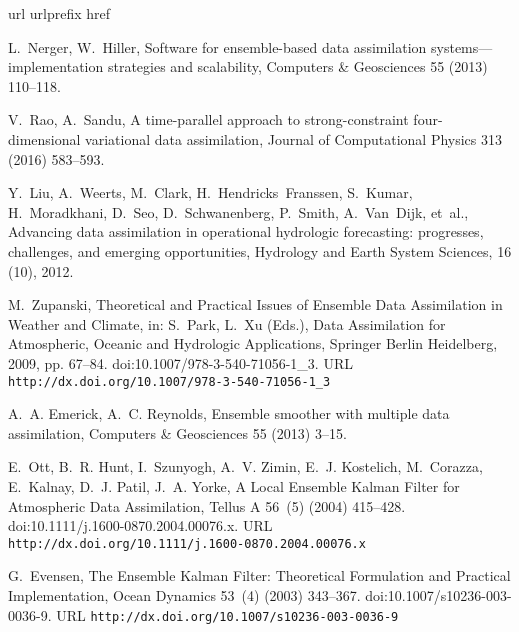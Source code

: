 \documentclass[12pt]{article}
\begin{document}
\begin{thebibliography}{10}
\expandafter\ifx\csname url\endcsname\relax
  \def\url#1{\texttt{#1}}\fi
\expandafter\ifx\csname urlprefix\endcsname\relax\def\urlprefix{URL }\fi
\expandafter\ifx\csname href\endcsname\relax
  \def\href#1#2{#2} \def\path#1{#1}\fi

L.~Nerger, W.~Hiller, Software for ensemble-based data assimilation
  systems—implementation strategies and scalability, Computers \& Geosciences
  55 (2013) 110--118.

V.~Rao, A.~Sandu, A time-parallel approach to strong-constraint
  four-dimensional variational data assimilation, Journal of Computational
  Physics 313 (2016) 583--593.

Y.~Liu, A.~Weerts, M.~Clark, H.~Hendricks~Franssen, S.~Kumar, H.~Moradkhani,
  D.~Seo, D.~Schwanenberg, P.~Smith, A.~Van~Dijk, et~al., Advancing data
  assimilation in operational hydrologic forecasting: progresses, challenges,
  and emerging opportunities, Hydrology and Earth System Sciences, 16 (10),
  2012.

M.~Zupanski, \href{http://dx.doi.org/10.1007/978-3-540-71056-1_3}{{Theoretical
  and Practical Issues of Ensemble Data Assimilation in Weather and Climate}},
  in: S.~Park, L.~Xu (Eds.), Data Assimilation for Atmospheric, Oceanic and
  Hydrologic Applications, Springer Berlin Heidelberg, 2009, pp. 67--84.
\newblock \href {http://dx.doi.org/10.1007/978-3-540-71056-1_3}
  {\path{doi:10.1007/978-3-540-71056-1_3}}.
\newline\urlprefix\url{http://dx.doi.org/10.1007/978-3-540-71056-1_3}

A.~A. Emerick, A.~C. Reynolds, Ensemble smoother with multiple data
  assimilation, Computers \& Geosciences 55 (2013) 3--15.

E.~Ott, B.~R. Hunt, I.~Szunyogh, A.~V. Zimin, E.~J. Kostelich, M.~Corazza,
  E.~Kalnay, D.~J. Patil, J.~A. Yorke,
  \href{http://dx.doi.org/10.1111/j.1600-0870.2004.00076.x}{{A Local Ensemble
  Kalman Filter for Atmospheric Data Assimilation}}, Tellus A 56~(5) (2004)
  415--428.
\newblock \href {http://dx.doi.org/10.1111/j.1600-0870.2004.00076.x}
  {\path{doi:10.1111/j.1600-0870.2004.00076.x}}.
\newline\urlprefix\url{http://dx.doi.org/10.1111/j.1600-0870.2004.00076.x}

G.~Evensen, \href{http://dx.doi.org/10.1007/s10236-003-0036-9}{{The Ensemble
  Kalman Filter: Theoretical Formulation and Practical Implementation}}, Ocean
  Dynamics 53~(4) (2003) 343--367.
\newblock \href {http://dx.doi.org/10.1007/s10236-003-0036-9}
  {\path{doi:10.1007/s10236-003-0036-9}}.
\newline\urlprefix\url{http://dx.doi.org/10.1007/s10236-003-0036-9}


\end{thebibliography}
\end{document}
